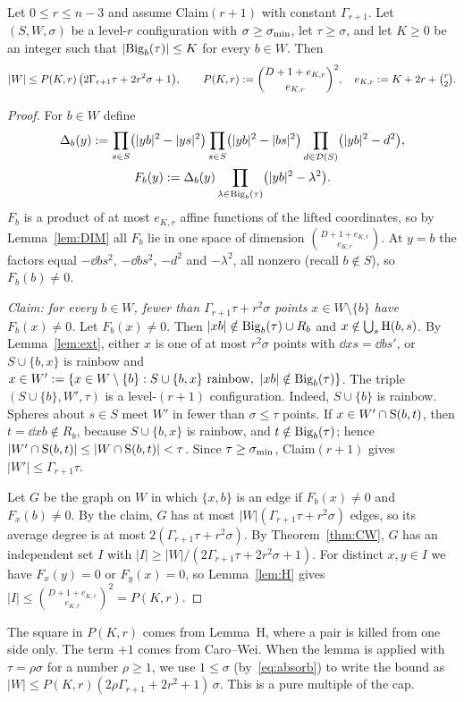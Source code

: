 \begin{lemma}\label{lem:kill}
Let $0\le r\le n-3$ and assume Claim$(r+1)$ with constant $\Gamma_{r+1}$. Let $(S,W,\sigma)$ be a level-$r$
configuration with $\sigma\ge\sigma_{\min}$, let $\tau\ge\sigma$, and let $K\ge0$ be an integer such that
$|\mathrm{Big}_b(\tau)|\le K$ for every $b\in W$. Then
\[
|W|\le P(K,r)\,\bigl(2\Gamma_{r+1}\tau+2r^2\sigma+1\bigr),\qquad P(K,r):=\binom{D+1+e_{K,r}}{e_{K,r}}^{2},\quad
e_{K,r}:=K+2r+\tbinom r2 .
\]
\end{lemma}
\begin{proof}
For $b\in W$ define
\begin{gather*}
\Delta_b(y):=\prod_{s\in S}\bigl(|yb|^2-|ys|^2\bigr)\prod_{s\in S}\bigl(|yb|^2-|bs|^2\bigr)
\prod_{d\in\mathcal{D}(S)}\bigl(|yb|^2-d^2\bigr),\\
F_b(y):=\Delta_b(y)\prod_{\lambda\in\mathrm{Big}_b(\tau)}\bigl(|yb|^2-\lambda^2\bigr).
\end{gather*}
$F_b$ is a product of at most $e_{K,r}$ affine functions of the lifted coordinates, so by Lemma~\ref{lem:DIM}
all $F_b$ lie in one space of dimension $\binom{D+1+e_{K,r}}{e_{K,r}}$. At $y=b$ the factors equal $-\dd bs^2$,
$-\dd bs^2$, $-d^2$ and $-\lambda^2$, all nonzero (recall $b\notin S$), so $F_b(b)\ne0$.

\emph{Claim: for every $b\in W$, fewer than $\Gamma_{r+1}\tau+r^2\sigma$ points $x\in W\setminus\{b\}$ have
$F_b(x)\ne0$.} Let $F_b(x)\ne0$. Then $|xb|\notin\mathrm{Big}_b(\tau)\cup R_b$ and $x\notin\bigcup_s\mathrm{H}(b,s)$. By
Lemma~\ref{lem:ext}, either $x$ is one of at most $r^2\sigma$ points with $\dd xs=\dd b{s'}$, or $S\cup\{b,x\}$ is
rainbow and $x\in W':=\{x\in W\setminus\{b\}:S\cup\{b,x\}\text{ rainbow},\ |xb|\notin\mathrm{Big}_b(\tau)\}$. The triple
$(S\cup\{b\},W',\tau)$ is a level-$(r+1)$ configuration. Indeed, $S\cup\{b\}$ is rainbow. Spheres about $s\in S$
meet $W'$ in fewer than $\sigma\le\tau$ points. If $x\in W'\cap\mathrm{S}(b,t)$, then $t=\dd xb\notin R_b$, because
$S\cup\{b,x\}$ is rainbow, and $t\notin\mathrm{Big}_b(\tau)$; hence $|W'\cap\mathrm{S}(b,t)|\le|W\cap\mathrm{S}(b,t)|<\tau$. Since
$\tau\ge\sigma_{\min}$, Claim$(r+1)$ gives $|W'|\le\Gamma_{r+1}\tau$.

Let $G$ be the graph on $W$ in which $\{x,b\}$ is an edge if $F_b(x)\ne0$ and $F_x(b)\ne0$. By the claim,
$G$ has at most $|W|(\Gamma_{r+1}\tau+r^2\sigma)$ edges, so its average degree is at most
$2(\Gamma_{r+1}\tau+r^2\sigma)$. By Theorem~\ref{thm:CW}, $G$ has an independent set $I$ with
$|I|\ge|W|/(2\Gamma_{r+1}\tau+2r^2\sigma+1)$. For distinct $x,y\in I$ we have $F_x(y)=0$ or $F_y(x)=0$, so
Lemma~\ref{lem:H} gives $|I|\le\binom{D+1+e_{K,r}}{e_{K,r}}^2=P(K,r)$.
\end{proof}

\begin{remark}\label{rem:killconst}
The square in $P(K,r)$ comes from Lemma~H, where a pair is killed from one side only. The term $+1$ comes from
Caro--Wei. When the lemma is applied with $\tau=\rho\sigma$ for a number $\rho\ge1$, we use $1\le\sigma$
(by~\eqref{eq:absorb}) to write the bound as $|W|\le P(K,r)(2\rho\Gamma_{r+1}+2r^2+1)\,\sigma$. This is a pure
multiple of the cap.
\end{remark}
